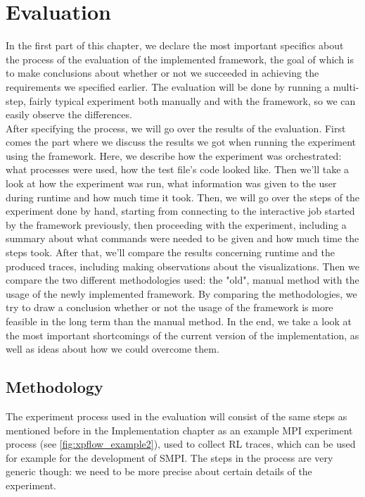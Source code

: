 



\chapter{Evaluation}
\label{Chapter5}

\label{sec:evaluation_plan}
In the first part of this chapter, we declare the most important
specifics about the process of the evaluation of the
implemented framework, the goal of which is to make
conclusions about whether or not we succeeded in achieving the
requirements we specified earlier. The evaluation will be done by
running a multi-step, fairly typical experiment both manually and with
the framework, so we can easily observe the differences.\\[0.3cm]
After specifying the process, we will go over the results of the
evaluation. First comes the part where we discuss the
results we got when running the experiment using the framework. Here,
we describe how the experiment was orchestrated: what processes were
used, how the test file's code looked like. Then we'll take a look at
how the experiment was run, what information was given to the user
during runtime and how much time it took. Then, we will go over the
steps of the experiment done by hand, starting from connecting to the
interactive job started by the framework previously, then proceeding
with the experiment, including a summary about what commands
were needed to be given and how much time the steps took. After that,
we'll compare the results concerning runtime and the produced traces,
including making observations about the visualizations. Then we
compare the two different methodologies used: the "old", manual method
with the usage of the newly implemented framework. By comparing the
methodologies, we try to draw a conclusion whether or not the usage of
the framework is more feasible in the long term than the manual
method. In the end, we take a look at the most important shortcomings
of the current version of the implementation, as well as ideas about
how we could overcome them.
\section{Methodology}
The experiment process used in the evaluation will consist of the same
steps as mentioned before in the Implementation chapter as an example
MPI experiment process (see \ref{fig:xpflow_example2}), used to collect
RL traces, which can be used for example for the development of
SMPI. The steps in the process are very generic though: we need to be
more precise about certain details of the experiment.
